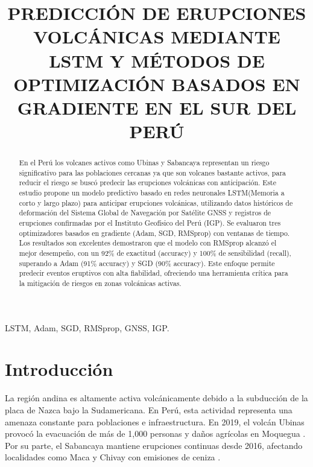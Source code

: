 \documentclass[conference]{IEEEtran}
\begin{document}
\title{PREDICCIÓN DE ERUPCIONES VOLCÁNICAS MEDIANTE LSTM Y MÉTODOS DE OPTIMIZACIÓN BASADOS EN GRADIENTE EN EL SUR DEL PERÚ
}

\author{
}

\maketitle

\begin{abstract}

En el Perú los volcanes activos como Ubinas y Sabancaya representan un riesgo significativo para las poblaciones cercanas ya que son volcanes bastante activos, para reducir el riesgo se buscó predecir las erupciones volcánicas con anticipación.
Este estudio propone un modelo predictivo basado en redes neuronales LSTM(Memoria a corto y largo plazo) para anticipar erupciones volcánicas, utilizando datos históricos de deformación del Sistema Global de Navegación por Satélite GNSS y registros de erupciones confirmadas por el Instituto Geofísico del Perú (IGP). Se evaluaron tres optimizadores basados en gradiente (Adam, SGD, RMSprop) con ventanas de tiempo.
Los resultados son excelentes demostraron que el modelo con RMSprop alcanzó el mejor desempeño, con un 92\% de exactitud (accuracy) y 100\% de sensibilidad (recall), superando a Adam (91\% accuracy) y SGD (90\% accuracy). Este enfoque permite predecir eventos eruptivos con alta fiabilidad, ofreciendo una herramienta crítica para la mitigación de riesgos en zonas volcánicas activas.

\end{abstract}

\begin{IEEEkeywords}
LSTM, Adam, SGD, RMSprop, GNSS, IGP.
\end{IEEEkeywords}

\section{Introducción}

La región andina es altamente activa volcánicamente debido a la subducción de la placa de Nazca bajo la Sudamericana. En Perú, esta actividad representa una amenaza constante para poblaciones e infraestructura. En 2019, el volcán Ubinas provocó la evacuación de más de 1,000 personas y daños agrícolas en Moquegua \cite{b1}. Por su parte, el Sabancaya mantiene erupciones continuas desde 2016, afectando localidades como Maca y Chivay con emisiones de ceniza \cite{b2}.
\end{document}
